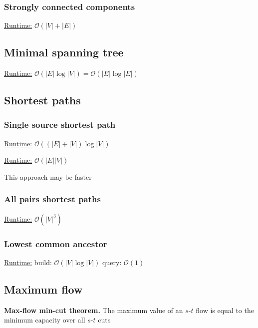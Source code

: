 \subsubsection{Strongly connected components}
\underline{Runtime:} $\mathcal{O}(\lvert V \rvert + \lvert E \rvert)$


\subsection{Minimal spanning tree}
\underline{Runtime:} $\mathcal{O}(\lvert E \rvert \log \lvert V
\rvert) = \mathcal{O}(\lvert E \rvert \log \lvert E \rvert)$

\subsection{Shortest paths}

\subsubsection{Single source shortest path}
\underline{Runtime:}
$\mathcal{O}((\lvert E \rvert + \lvert V \rvert )\log \lvert V
\rvert)$

\underline{Runtime:} $\mathcal{O}(\lvert E \rvert \lvert V \rvert)$

This approach may be faster
\subsubsection{All pairs shortest paths}
\underline{Runtime:} $\mathcal{O}(\lvert V \rvert^3)$

\subsubsection{Lowest common ancestor}
\underline{Runtime:} build: $\mathcal{O}(\lvert V \rvert \log \lvert
V\rvert)$ query: $\mathcal{O}(1)$

\subsection{Maximum flow}

\textbf{Max-flow min-cut theorem.} The maximum value of an $s$-$t$ flow is
equal to the minimum capacity over all $s$-$t$ cuts

